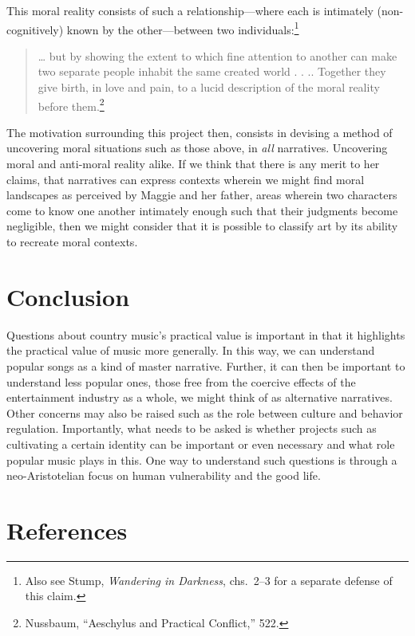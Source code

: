 \documentclass[phdthesis,12pt,final]{wuthesis}
\theoremstyle{definition}
\theoremstyle{definition}
\theoremstyle{definition}
\theoremstyle{definition}
\theoremstyle{remark}
\begin{document}
This moral reality consists of such a relationship---where each is intimately (non-cognitively) known by the other---between two individuals:\footnote{Also see Stump, \emph{Wandering in {Darkness}}, chs.~2--3 for a separate defense of this claim.}

\begin{quote}
\ldots{} but by showing the extent to which fine attention to another can make two separate people inhabit the same created world . . .. Together they give birth, in love and pain, to a lucid description of the moral reality before them.\footnote{Nussbaum, {``Aeschylus and Practical Conflict,''} 522.}
\end{quote}

The motivation surrounding this project then, consists in devising a method of uncovering moral situations such as those above, in \emph{all} narratives. Uncovering moral and anti-moral reality alike. If we think that there is any merit to her claims, that narratives can express contexts wherein we might find moral landscapes as perceived by Maggie and her father, areas wherein two characters come to know one another intimately enough such that their judgments become negligible, then we might consider that it is possible to classify art by its ability to recreate moral contexts.

\chapter{Conclusion}\label{conclusion-1}

Questions about country music's practical value is important in that it highlights the practical value of music more generally. In this way, we can understand popular songs as a kind of master narrative. Further, it can then be important to understand less popular ones, those free from the coercive effects of the entertainment industry as a whole, we might think of as alternative narratives. Other concerns may also be raised such as the role between culture and behavior regulation. Importantly, what needs to be asked is whether projects such as cultivating a certain identity can be important or even necessary and what role popular music plays in this. One way to understand such questions is through a neo-Aristotelian focus on human vulnerability and the good life.

\chapter{References}\label{references}
\end{document}
